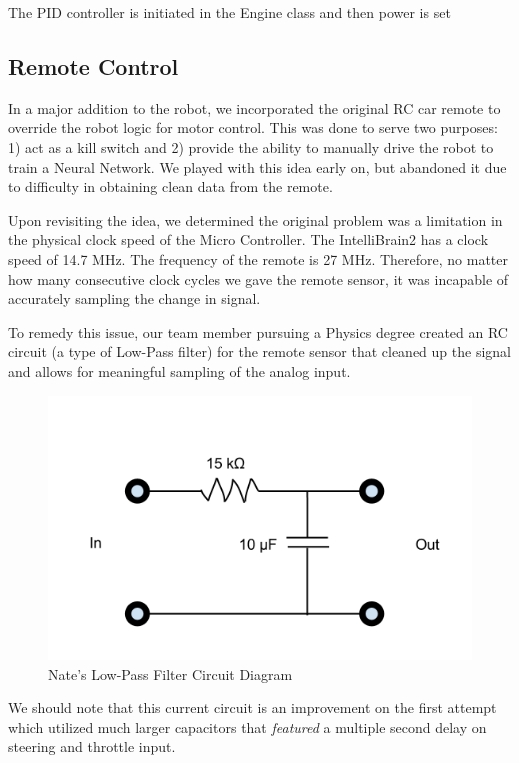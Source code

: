 \documentclass[12pt]{article}
\begin{document}
The PID controller is initiated in the Engine class and then power is set 

\clearpage
\subsection{Remote Control}
In a major addition to the robot, we incorporated the original RC car remote to override the robot logic for motor control.  This was done to serve two purposes: 1) act as a kill switch and 2) provide the ability to manually drive the robot to train a Neural Network.  We played with this idea early on, but abandoned it due to difficulty in obtaining clean data from the remote.

Upon revisiting the idea, we determined the original problem was a limitation in the physical clock speed of the Micro Controller.  The IntelliBrain2 has a clock speed of 14.7 MHz.  The frequency of the remote is 27 MHz.  Therefore, no matter how many consecutive clock cycles we gave the remote sensor, it was incapable of accurately sampling the change in signal.

To remedy this issue, our team member pursuing a Physics degree created an RC circuit (a type of Low-Pass filter) for the remote sensor that cleaned up the signal and allows for meaningful sampling of the analog input.  
\begin{figure}[h]
\centerline{\includegraphics[scale=.5]{img/circuit}}
\caption{Nate's Low-Pass Filter Circuit Diagram}
\end{figure}

We should note that this current circuit is an improvement on the first attempt which utilized much larger capacitors that \textit{featured} a multiple second delay on steering and throttle input.
\end{document}
